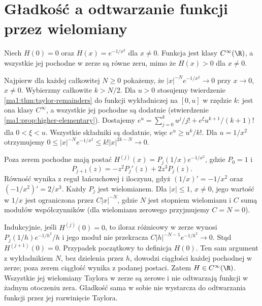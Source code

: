 \section{Gładkość a odtwarzanie funkcji przez wielomiany}
\begin{przyklad}
\label{ma1:ex:taylor-flat}
Niech $H(0)=0$ oraz $H(x)=e^{-1/x^2}$ dla $x\ne0$. Funkcja jest klasy $C^\infty(\R)$, a wszystkie jej pochodne w zerze są równe zeru, mimo że $H(x)>0$ dla $x\ne0$.

Najpierw dla każdej całkowitej $N\ge0$ pokażemy, że $|x|^{-N}e^{-1/x^2}\to0$ przy $x\to0$, $x\ne0$. Wybierzmy całkowite $k>N/2$. Dla $u>0$ stosujemy twierdzenie \ref{ma1:thm:taylor-remainders} do funkcji wykładniczej na $[0,u]$ w rzędzie $k$: jest ona klasy $C^\infty$, a wszystkie jej pochodne są dodatnie (stwierdzenie \ref{ma1:prop:higher-elementary}). Dostajemy $e^u=\sum_{j=0}^k u^j/j!+e^\xi u^{k+1}/(k+1)!$ dla $0<\xi<u$. Wszystkie składniki są dodatnie, więc $e^u\ge u^k/k!$. Dla $u=1/x^2$ otrzymujemy $0\le |x|^{-N}e^{-1/x^2}\le k!|x|^{2k-N}\to0$.

Poza zerem pochodne mają postać $H^{(j)}(x)=P_j(1/x)e^{-1/x^2}$, gdzie $P_0=1$ i
\[
 P_{j+1}(z)=-z^2P_j'(z)+2z^3P_j(z).
\]
Równość wynika z reguł łańcuchowej i iloczynu, gdyż $(1/x)'=-1/x^2$ oraz $(-1/x^2)'=2/x^3$. Każdy $P_j$ jest wielomianem. Dla $|x|\le1$, $x\ne0$, jego wartość w $1/x$ jest ograniczona przez $C|x|^{-N}$, gdzie $N$ jest stopniem wielomianu i $C$ sumą modułów współczynników (dla wielomianu zerowego przyjmujemy $C=N=0$).

Indukcyjnie, jeśli $H^{(j)}(0)=0$, to iloraz różnicowy w zerze wynosi $P_j(1/h)e^{-1/h^2}/h$ i jego moduł nie przekracza $C|h|^{-N-1}e^{-1/h^2}\to0$. Stąd $H^{(j+1)}(0)=0$. Przypadek początkowy to definicja $H(0)$. Ten sam argument z wykładnikiem $N$, bez dzielenia przez $h$, dowodzi ciągłości każdej pochodnej w zerze; poza zerem ciągłość wynika z podanej postaci. Zatem $H\in C^\infty(\R)$. Wszystkie jej wielomiany Taylora w zerze są zerowe i nie odtwarzają funkcji w żadnym otoczeniu zera. Gładkość sama w sobie nie wystarcza do odtwarzania funkcji przez jej rozwinięcie Taylora.
\end{przyklad}
